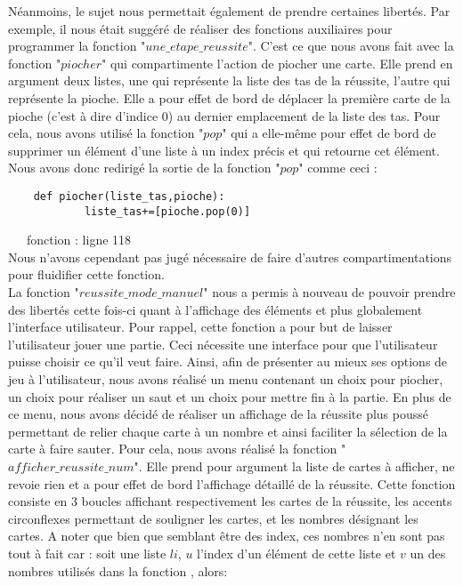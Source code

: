 \documentclass[10pt,a4paper,french,titlepage]{article}
\theoremstyle{definition}
\begin{document}
Néanmoins, le sujet nous permettait également de prendre certaines libertés. Par exemple, il nous était suggéré de réaliser des fonctions auxiliaires pour programmer la fonction "$une\_etape\_reussite$". C'est ce que nous avons fait avec la fonction "$piocher$" qui compartimente l'action de piocher une carte. Elle prend en argument deux listes, une qui représente la liste des tas de la réussite, l'autre qui représente la pioche. Elle a pour effet de bord de déplacer la première carte de la pioche (c'est à dire d'indice 0) au dernier emplacement de la liste des tas. Pour cela, nous avons utilisé la fonction "$pop$" qui a elle-même pour effet de bord de supprimer un élément d'une liste à un index précis et qui retourne cet élément. Nous avons donc redirigé la sortie de la fonction "$pop$" comme ceci : \\

\begin{lstlisting}
	def piocher(liste_tas,pioche):
    		liste_tas+=[pioche.pop(0)]

\end{lstlisting}

~~~fonction : ligne 118\\



Nous n'avons cependant pas jugé nécessaire de faire d'autres compartimentations pour fluidifier cette fonction.\\

La fonction "$reussite\_mode\_manuel$" nous a permis à nouveau de pouvoir prendre des libertés cette fois-ci quant à l'affichage des éléments et plus globalement l'interface utilisateur. Pour rappel, cette fonction a pour but de laisser l'utilisateur jouer une partie. Ceci nécessite une interface pour que l'utilisateur puisse choisir ce qu'il veut faire. Ainsi, afin de présenter au mieux ses options de jeu à l'utilisateur, nous avons réalisé un menu contenant un choix pour piocher, un choix pour réaliser un saut et un choix pour mettre fin à la partie. En plus de ce menu, nous avons décidé de réaliser un affichage de la réussite plus poussé permettant de relier chaque carte à un nombre et ainsi faciliter la sélection de la carte à faire sauter. 
Pour cela, nous avons réalisé la fonction "$afficher\_reussite\_num$". Elle prend pour argument la liste de cartes à afficher, ne revoie rien et a pour effet de bord l'affichage détaillé de la réussite. Cette fonction consiste en 3 boucles affichant respectivement les cartes de la réussite, les
accents circonflexes permettant de souligner les cartes, et les nombres désignant les cartes. A noter que bien que semblant être des index, ces nombres n'en sont pas tout à fait car : soit une liste $li$, $u$ l'index d'un élément de cette liste et $v$ un des nombres utilisés dans la fonction , alors:
\end{document}
